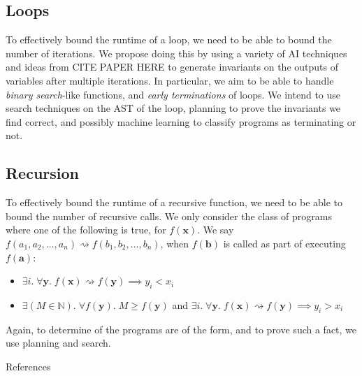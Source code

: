 \documentclass{mfcs}
\begin{document}
{\color{colour}\subsection{Loops}}

To effectively bound the runtime of a loop, we need to be able to bound the number of iterations.  We propose doing this by
using a variety of AI techniques and ideas from CITE PAPER HERE to generate invariants on the outputs of variables after
multiple iterations.  In particular, we aim to be able to handle \emph{binary search}-like functions, and \emph{early terminations}
of loops.  We intend to use search techniques on the AST of the loop, planning to prove the invariants we find correct, and possibly
machine learning to classify programs as terminating or not.

{\color{colour}\subsection{Recursion}}

To effectively bound the runtime of a recursive function, we need to be able to bound the number of recursive calls.  We only consider
the class of programs where one of the following is true, for $f(\textbf{x})$.  We say $f(a_1, a_2, \dots, a_n) \rightsquigarrow f(b_1, b_2, \dots, b_n)$, when
$f(\textbf{b})$ is called as part of executing $f(\textbf{a})$:
\begin{itemize}
    \item $\exists i.\; \forall \textbf{y}.\; f(\textbf{x}) \rightsquigarrow f(\textbf{y}) \implies y_i < x_i$
    \item $\exists (M \in \mathbb{N}).\; \forall f(\textbf{y}).\; M \geq f(\textbf{y})$ and $\exists i.\; \forall \textbf{y}.\; f(\textbf{x}) \rightsquigarrow f(\textbf{y}) \implies y_i > x_i$
\end{itemize}

Again, to determine of the programs are of the form, and to prove such a fact, we use planning and search.

\begin{question}{References}
\end{question}
\end{document}
